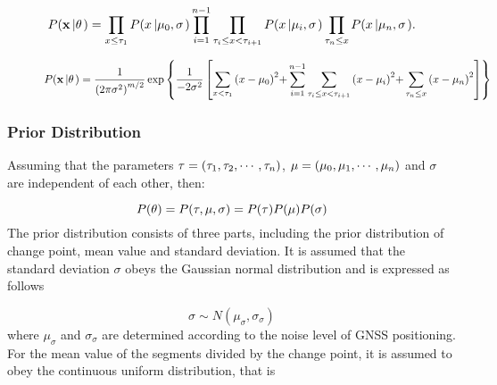 \documentclass[journal]{IEEEtran}
\begin{document}
\begin{figure*}
\begin{equation}\label{eq_likelihoodfunc}
P({\bf{x}}\left| {\bf{\theta }} \right.) = \prod\limits_{x \le {\tau _1}} {P(x\left| {{\mu_0},\sigma } \right.)} \prod\limits_{i = 1}^{n - 1} {\prod\limits_{{\tau _i} \le x < {\tau _{i + 1}}} {P(x\left| {{\mu_i},\sigma } \right.)} \prod\limits_{{\tau _n} \le x} {P(x\left| {{\mu_n},\sigma } \right.)} }.
\end{equation}
\end{figure*}
\begin{figure*}
\begin{equation}\label{eq_likelihoodfunc_detail}
P({\bf{x}}\left| {\bf{\theta }} \right.) = \frac{1}{{{{(2\pi {\sigma ^2})}^{m/2}}}}\exp \left\{ {\frac{1}{{ - 2{\sigma ^2}}}\left[ {\sum\limits_{x < {\tau _1}} {{{(x - {\mu_0})}^2}} {\rm{ + }}\sum\limits_{i = 1}^{n - 1} {\sum\limits_{{\tau _i} \le x < {\tau _{i + 1}}} {{{(x - {\mu_i})}^2}} } {\rm{ + }}\sum\limits_{{\tau _n} \le x} {{{(x - {\mu_n})}^2}} } \right]} \right\}
\end{equation}
\end{figure*}

\subsubsection{Prior Distribution}
Assuming that the parameters ${\bf{\tau }}=(\tau_1,\tau_2,\cdots,\tau_n)$, ${\bf{\mu }}=(\mu_0,\mu_1,\cdots,\mu_n)$ and $\sigma$ are independent of each other, then:

\begin{equation}\label{eq_bayesian_prior}
P({\bf{\theta }}) = P({\bf{\tau }},{\bf{\mu }},\sigma ) = P({\bf{\tau }})P({\bf{\mu }})P(\sigma )
\end{equation}
The prior distribution consists of three parts, including the prior distribution of change point, mean value and standard deviation. It is assumed that the standard deviation $\sigma$ obeys the Gaussian normal distribution and is expressed as follows

\begin{equation}\label{eq_bayesian_prior_sigma}
\sigma  \sim N({\mu _\sigma },{\sigma _\sigma })
\end{equation}
where $\mu_{\sigma}$ and $\sigma_{\sigma}$ are determined according to the noise level of GNSS positioning.
For the mean value of the segments divided by the change point, it is assumed to obey the continuous uniform distribution, that is
\end{document}
